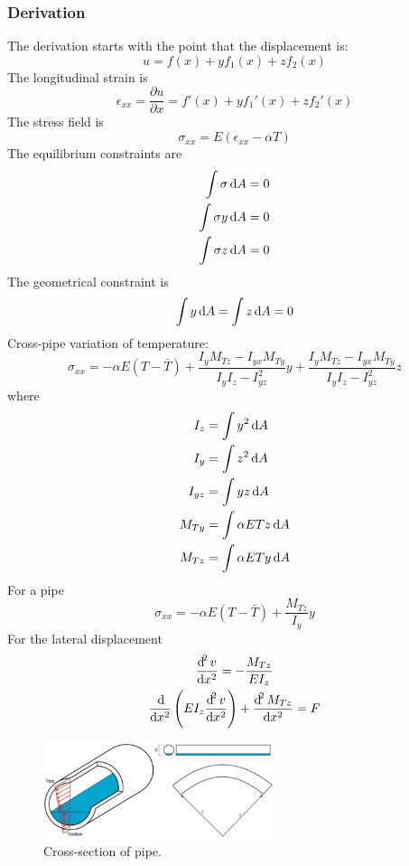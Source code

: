\subsubsection{Derivation}
The derivation starts with the point that the displacement is:
\begin{equation}
    u = f\left(x\right) + yf_1\left(x\right) + zf_2\left(x\right)
\end{equation}
The longitudinal strain is
\begin{equation}
    \epsilon_{xx} = \frac{\partial u}{\partial x} = f'\left(x\right) + yf_1'\left(x\right) + zf_2'\left(x\right)
\end{equation}
The stress field is
\begin{equation}
    \sigma_{xx} = E \left(\epsilon_{xx} - \alpha T\right)
\end{equation}
The equilibrium constraints are
\begin{align}
    \int \sigma \dif A   & = 0 \\
    \int \sigma y \dif A & = 0 \\
    \int \sigma z \dif A & = 0
\end{align}
The geometrical constraint is
\begin{equation}
    \int y \dif A = \int z \dif A = 0
\end{equation}
Cross-pipe variation of temperature:
\begin{equation}
    \sigma_{xx} = -\alpha E\left(T - \bar{T}\right) + \frac{I_yM_{Tz}-I_{yx}M_{Ty}}{I_yI_z-I^2_{yz}}y + \frac{I_yM_{Tz}-I_{yx}M_{Ty}}{I_yI_z-I^2_{yz}}z
\end{equation}
where
\begin{align}
    I_z    & = \int y^2 \dif A        \\
    I_y    & = \int z^2 \dif A        \\
    I_{yz} & = \int yz \dif A         \\
    M_{Ty} & = \int \alpha ETz \dif A \\
    M_{Tz} & = \int \alpha ETy \dif A
\end{align}
For a pipe
\begin{equation}
    \sigma_{xx} = -\alpha E \left(T - \bar{T}\right) + \frac{M_{Tz}}{I_y}y
\end{equation}
For the lateral displacement
\begin{gather}
    \frac{\dif^2 v}{\dif x^2} = - \frac{M_{Tz}}{EI_z}\\
    \frac{\dif}{\dif x^2}\left(EI_z\frac{\dif^2 v}{\dif x^2}\right) + \frac{\dif^2 M_{Tz}}{\dif x^2} = F
\end{gather}
\begin{figure}[H]
    \centering
    \includegraphics[width = 0.6\textwidth]{img/figure62.png}
    \caption{Cross-section of pipe.}
\end{figure}
